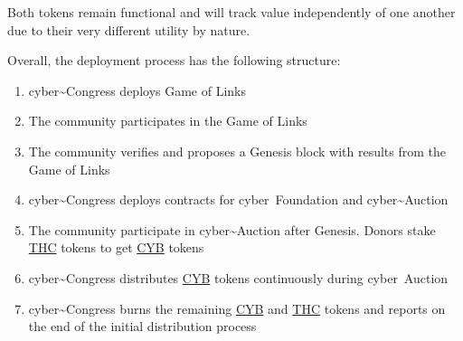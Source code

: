 \documentclass[8pt,oneside]{amsart}
\begin{document}
Both tokens remain functional and will track value independently of one another due to their very different utility by nature.

Overall, the deployment process has the following structure:

\begin{enumerate}
 \item cyber\~{}Congress deploys Game of Links
 \item The community participates in the Game of Links
 \item The community verifies and proposes a Genesis block with results from the Game of Links
 \item cyber\~{}Congress deploys contracts for cyber~Foundation and cyber\~{}Auction
 \item The community participate in cyber\~{}Auction after Genesis. Donors stake {\hyperref[thc]{THC}} tokens to get {\hyperref[cyb]{CYB}} tokens
 \item cyber\~{}Congress distributes {\hyperref[cyb]{CYB}} tokens continuously during cyber~Auction
 \item cyber\~{}Congress burns the remaining {\hyperref[cyb]{CYB}} and {\hyperref[thc]{THC}} tokens and reports on the end of the initial distribution process
\end{enumerate}
\end{document}
